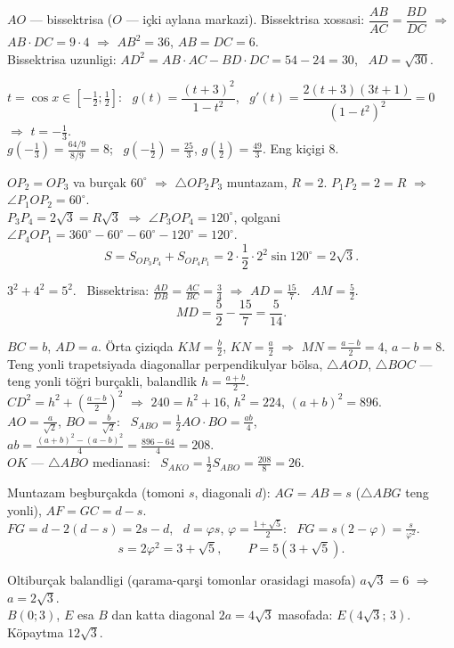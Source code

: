 $AO$ — bissektrisa ($O$ — içki aylana markazi). Bissektrisa xossasi: $\dfrac{AB}{AC}=\dfrac{BD}{DC}$ $\Rightarrow$ $AB\cdot DC=9\cdot4$ $\Rightarrow$ $AB^2=36$, $AB=DC=6$.\\
Bissektrisa uzunligi: $AD^2=AB\cdot AC-BD\cdot DC=54-24=30$, \ $AD=\sqrt{30}$.

$t=\cos x\in\left[-\frac12;\frac12\right]$: \ $g(t)=\dfrac{(t+3)^2}{1-t^2}$, \ $g'(t)=\dfrac{2(t+3)(3t+1)}{(1-t^2)^2}=0$ $\Rightarrow$ $t=-\frac13$.\\
$g\left(-\frac13\right)=\frac{64/9}{8/9}=8$; \ $g\left(-\frac12\right)=\frac{25}3$, $g\left(\frac12\right)=\frac{49}3$. Eng kiçigi $8$.

$OP_2=OP_3$ va burçak $60^\circ$ $\Rightarrow$ $\triangle OP_2P_3$ muntazam, $R=2$. $P_1P_2=2=R$ $\Rightarrow$ $\angle P_1OP_2=60^\circ$.\\
$P_3P_4=2\sqrt3=R\sqrt3$ $\Rightarrow$ $\angle P_3OP_4=120^\circ$, qolgani $\angle P_4OP_1=360^\circ-60^\circ-60^\circ-120^\circ=120^\circ$.
\[S=S_{OP_3P_4}+S_{OP_4P_1}=2\cdot\frac12\cdot2^2\sin120^\circ=2\sqrt3.\]

$3^2+4^2=5^2$. \ Bissektrisa: $\frac{AD}{DB}=\frac{AC}{BC}=\frac34$ $\Rightarrow$ $AD=\frac{15}7$. \ $AM=\frac52$.
\[MD=\frac52-\frac{15}7=\frac5{14}.\]

$BC=b$, $AD=a$. Örta çiziqda $KM=\frac b2$, $KN=\frac a2$ $\Rightarrow$ $MN=\frac{a-b}2=4$, $a-b=8$.\\
Teng yonli trapetsiyada diagonallar perpendikulyar bölsa, $\triangle AOD$, $\triangle BOC$ — teng yonli töğri burçakli, balandlik $h=\frac{a+b}2$.\\
$CD^2=h^2+\left(\frac{a-b}2\right)^2$ $\Rightarrow$ $240=h^2+16$, $h^2=224$, $(a+b)^2=896$.\\
$AO=\frac a{\sqrt2}$, $BO=\frac b{\sqrt2}$: \ $S_{ABO}=\frac12AO\cdot BO=\frac{ab}4$, \ $ab=\frac{(a+b)^2-(a-b)^2}4=\frac{896-64}4=208$.\\
$OK$ — $\triangle ABO$ medianasi: \ $S_{AKO}=\frac12S_{ABO}=\frac{208}8=26$.

Muntazam beşburçakda (tomoni $s$, diagonali $d$): $AG=AB=s$ ($\triangle ABG$ teng yonli), $AF=GC=d-s$.\\
$FG=d-2(d-s)=2s-d$, \ $d=\varphi s$, $\varphi=\frac{1+\sqrt5}2$: \ $FG=s(2-\varphi)=\frac s{\varphi^2}$.
\[s=2\varphi^2=3+\sqrt5,\qquad P=5\left(3+\sqrt5\right).\]

Oltiburçak balandligi (qarama-qarşi tomonlar orasidagi masofa) $a\sqrt3=6$ $\Rightarrow$ $a=2\sqrt3$.\\
$B(0;3)$, $E$ esa $B$ dan katta diagonal $2a=4\sqrt3$ masofada: $E\left(4\sqrt3;\,3\right)$. Köpaytma $12\sqrt3$.

